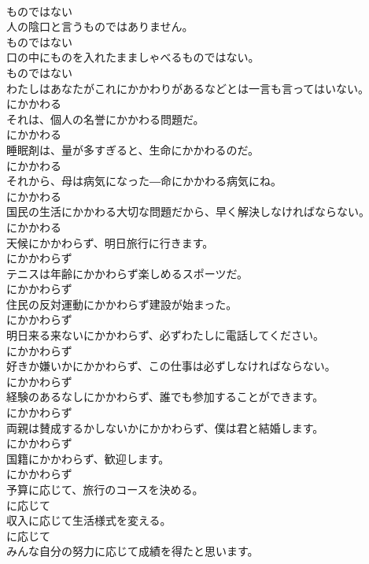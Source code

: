 \documentclass[8pt]{extreport}
\begin{document}
\begin{CJK}{UTF8}{min}
\\	ものではない
\\	人の陰口と言うものではありません。	
\\	ものではない
\\	口の中にものを入れたまましゃべるものではない。	
\\	ものではない
\\	わたしはあなたがこれにかかわりがあるなどとは一言も言ってはいない。	
\\	にかかわる
\\	それは、個人の名誉にかかわる問題だ。	
\\	にかかわる
\\	睡眠剤は、量が多すぎると、生命にかかわるのだ。	
\\	にかかわる
\\	それから、母は病気になった―命にかかわる病気にね。	
\\	にかかわる
\\	国民の生活にかかわる大切な問題だから、早く解決しなければならない。	
\\	にかかわる
\\	天候にかかわらず、明日旅行に行きます。	
\\	にかかわらず
\\	テニスは年齢にかかわらず楽しめるスポーツだ。	
\\	にかかわらず
\\	住民の反対運動にかかわらず建設が始まった。	
\\	にかかわらず
\\	明日来る来ないにかかわらず、必ずわたしに電話してください。	
\\	にかかわらず
\\	好きか嫌いかにかかわらず、この仕事は必ずしなければならない。	
\\	にかかわらず
\\	経験のあるなしにかかわらず、誰でも参加することができます。	
\\	にかかわらず
\\	両親は賛成するかしないかにかかわらず、僕は君と結婚します。	
\\	にかかわらず
\\	国籍にかかわらず、歓迎します。	
\\	にかかわらず
\\	予算に応じて、旅行のコースを決める。	
\\	に応じて
\\	収入に応じて生活様式を変える。	
\\	に応じて
\\	みんな自分の努力に応じて成績を得たと思います。	

\end{CJK}
\end{document}

